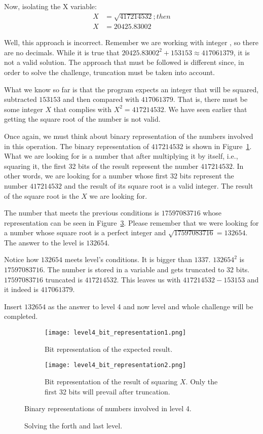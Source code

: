 Now, isolating the X variable:
\begin{equation*}
	\begin{aligned}
		X &= \sqrt{417214532}; then\\
		X &= 20425.83002
	\end{aligned}
\end{equation*}

Well, this approach is incorrect. Remember we are working with integer , so there are no decimals. While it is true that $20425.83002^2 + 153153 \approx 417061379$, it is not a valid solution. The approach that must be followed is different since, in order to solve the challenge, truncation must be taken into account.  

What we know so far is that the program expects an integer that will be squared, subtracted $153153$ and then compared with $417061379$. That is, there must be some integer $X$ that complies with $X^2 = 417214532$. We have seen earlier that getting the square root of the number is not valid. 

Once again, we must think about binary representation of the numbers involved in this operation. The binary representation of $417214532$ is shown in Figure~\ref{fig:level4_bit_representation}. What we are looking for is a number that after multiplying it by itself, i.e., squaring it, the first 32 bits of the result represent the number $417214532$. In other words, we are looking for a number whose first 32 bits represent the number $417214532$ and the result of its square root is a valid integer. The result of the square root is the $X$ we are looking for. 

The number that meets the previous conditions is $17597083716$ whose representation can be seen in Figure~\ref{fig:level4_bit_representation2}. Please remember that we were looking for a number whose square root is a perfect integer and $\sqrt{17597083716} = 132654$. The answer to the level is $132654$.

Notice how $132654$ meets level's conditions. It is bigger than $1337$. $132654^2$ is $17597083716$. The number is stored in a  variable and gets truncated to 32 bits. $17597083716$ truncated is $417214532$. This leaves us with  $417214532 - 153153$ and it indeed is $417061379$. 

Insert $132654$ as the answer to level 4 and now level and whole challenge will be completed. 
\begin{figure}
	\begin{subfigure}[t]{.5\textwidth}
		\centering
		\texttt{[image: level4\_bit\_representation1.png]}
		\caption{Bit representation of the expected result.}
		\label{fig:level4_bit_representation}
	\end{subfigure}
	\begin{subfigure}[t]{.5\textwidth}
		\texttt{[image: level4\_bit\_representation2.png]}
		\caption{Bit representation of the result of squaring $X$. Only the first 32 bits will prevail after truncation.}
		\label{fig:level4_bit_representation2}
	\end{subfigure}
	\caption{Binary representations of numbers involved in level 4.}
\end{figure}

\begin{figure}[!h]
	\caption{Solving the forth and last level.}
	\label{fig:solved_level4}
\end{figure}